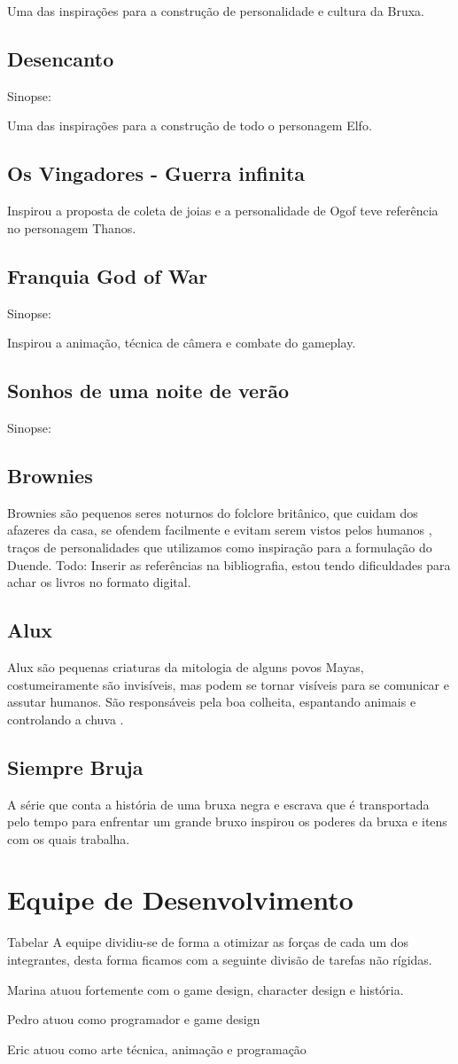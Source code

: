 Uma das inspirações para a construção de personalidade e cultura da Bruxa.
\subsection{Desencanto}
Sinopse:

Uma das inspirações para a construção de todo o personagem Elfo.
\subsection{Os Vingadores - Guerra infinita}
Inspirou a proposta de coleta de joias e a personalidade de Ogof teve referência no personagem Thanos.
\subsection{Franquia God of War}
Sinopse:

Inspirou a animação, técnica de câmera e combate do gameplay.
\subsection{Sonhos de uma noite de verão}
Sinopse:

\subsection{Brownies}
Brownies são pequenos seres noturnos do folclore britânico, que cuidam dos afazeres da casa, se ofendem facilmente e evitam serem vistos pelos humanos \cite{britannica_2011}, traços de personalidades que utilizamos como inspiração para a formulação do Duende.
Todo: Inserir as referências na bibliografia, estou tendo dificuldades para achar os livros no formato digital.

\subsection{Alux}
Alux são pequenas criaturas da mitologia de alguns povos Mayas, costumeiramente são invisíveis, mas podem se tornar visíveis para se comunicar e assutar humanos.  São responsáveis pela boa colheita, espantando animais e controlando a chuva \cite{judith_2009}. 

\subsection{Siempre Bruja}
A série que conta a história de uma bruxa negra e escrava que é transportada  pelo tempo para enfrentar um grande bruxo inspirou os poderes da bruxa e itens com os quais trabalha. 

\section{Equipe de Desenvolvimento}
Tabelar
A equipe dividiu-se de forma a otimizar as forças de cada um dos integrantes, desta forma ficamos com a seguinte divisão de tarefas não rígidas. 

Marina atuou fortemente com o game design, character design e história. 

Pedro atuou como programador e game design

Eric atuou como arte técnica, animação e programação